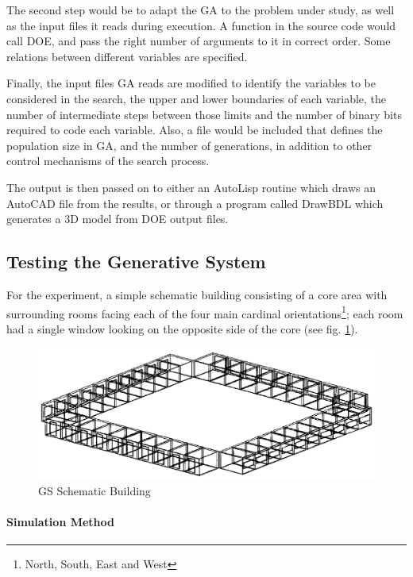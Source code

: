 The second step would be to adapt the GA to the problem under study, as well as the input files it reads during execution. A function in the source code would call DOE, and pass the right number of arguments to it in correct order. Some relations between different variables are specified. 

Finally, the input files GA reads are modified to identify the variables to be considered in the search, the upper and lower boundaries of each variable, the number of intermediate steps between those limits and the number of binary bits required to code each variable. Also, a file would be included that defines the population size in GA, and the number of generations, in addition to other control mechanisms of the search process.

The output is then passed on to either an AutoLisp routine which draws an AutoCAD file from the results, or through a program called DrawBDL which generates a 3D model from DOE output files.

\subsection{Testing the Generative System}

For the experiment, a simple schematic building consisting of a core area with surrounding rooms facing each of the four main cardinal orientations\footnote{North, South, East and West}; each room had a single window looking on the opposite side of the core (see fig. \ref{fig:SchmBuild}).

\begin{figure}[htbp]
\centering
\includegraphics[width=\textwidth]{./Images/16-SchematicBuilding}
\caption[GS Schematic Building]{GS Schematic Building \cite{caldas01}}
\label{fig:SchmBuild}
\end{figure}

\paragraph{Simulation Method}\mbox{}

